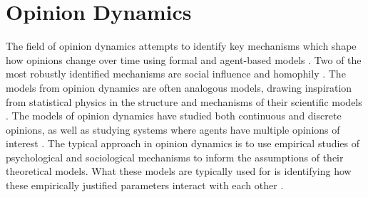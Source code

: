 \documentclass[11pt]{article}
\begin{document}
\section{Opinion Dynamics}
The field of opinion dynamics attempts to identify key mechanisms which shape how opinions change over time using formal and agent-based models \cite{flache_models_2017,flache_between_2018,noorazar_classical_2020}. Two of the most robustly identified mechanisms are social influence and homophily \cite{flache_models_2017}. The models from opinion dynamics are often analogous models, drawing inspiration from statistical physics in the structure and mechanisms of their scientific models \cite{galesic_integrating_2021}. The models of opinion dynamics have studied both continuous and discrete opinions, as well as studying systems where agents have multiple opinions of interest \cite{flache_models_2017}. The typical approach in opinion dynamics is to use empirical studies of psychological and sociological mechanisms to inform the assumptions of their theoretical models. What these models are typically used for is identifying how these empirically justified parameters interact with each other  \cite{baumann2021modeling,chacoma_opinion_2015,flache_models_2017,friedkin_social_1990,noorazar_classical_2020,spears_social_2021,turner_paths_2018}. 
\end{document}
